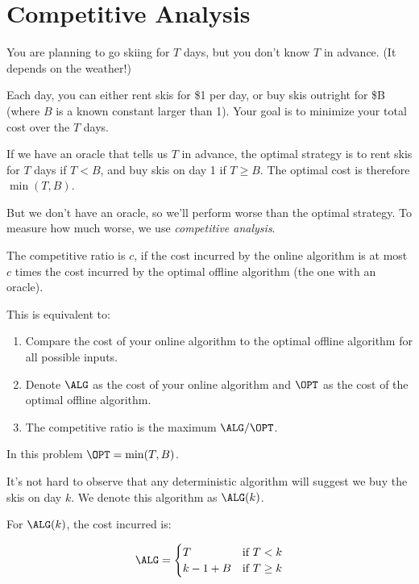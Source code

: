 \chapter{Competitive Analysis}

\begin{problem}
You are planning to go skiing for $T$ days, but you don't know $T$ in advance. (It depends on the weather!)

Each day, you can either rent skis for \$1 per day, or buy skis outright for \$B (where $B$ is a known constant larger than 1). Your goal is to minimize your total cost over the $T$ days.
\end{problem}

If we have an oracle that tells us $T$ in advance, the optimal strategy is to rent skis for $T$ days if $T < B$, and buy skis on day 1 if $T \geq B$. The optimal cost is therefore $\min(T, B)$.

But we don't have an oracle, so we'll perform worse than the optimal strategy. To measure how much worse, we use \textit{competitive analysis}.

\begin{definition}
	The competitive ratio is $c$, if the cost incurred by the online algorithm is at most $c$ times the cost incurred by the optimal offline algorithm (the one with an oracle).
\end{definition}

\begin{remark}
	This is equivalent to:
	\begin{enumerate}
		\item Compare the cost of your online algorithm to the optimal offline algorithm for all possible inputs.
		\item Denote $\ALG$ as the cost of your online algorithm and $\OPT$ as the cost of the optimal offline algorithm.
		\item The competitive ratio is the maximum $\ALG / \OPT$.
	\end{enumerate}
\end{remark}

In this problem $\OPT = \min(T, B)$.

It's not hard to observe that any deterministic algorithm will suggest we buy the skis on day $k$. We denote this algorithm as $\ALG(k)$.

For $\ALG(k)$, the cost incurred is:

\[ \ALG = \begin{cases}
		T         & \text{if } T < k    \\
		k - 1 + B & \text{if } T \geq k
	\end{cases} \]

